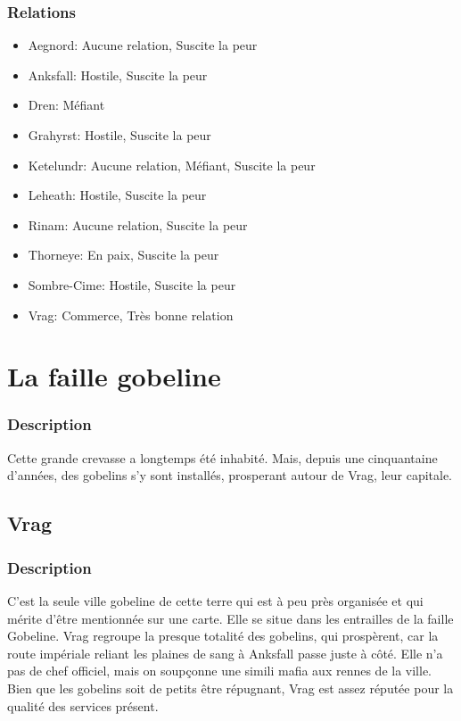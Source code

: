 \subsubsection{Relations}
\begin{itemize}
\item Aegnord: Aucune relation, Suscite la peur  
\item Anksfall: Hostile, Suscite la peur  
\item Dren: Méfiant   
\item Grahyrst: Hostile, Suscite la peur  
\item Ketelundr: Aucune relation, Méfiant, Suscite la peur 
\item Leheath: Hostile, Suscite la peur  
\item Rinam: Aucune relation, Suscite la peur
\item Thorneye: En paix, Suscite la peur
\item Sombre-Cime: Hostile, Suscite la peur  
\item Vrag: Commerce, Très bonne relation 
\end{itemize}
\section{La faille gobeline}
\subsubsection{Description}
\hypertarget {lafaillegobeline}{}Cette grande crevasse a longtemps été inhabité.
Mais, depuis une cinquantaine d'années, des gobelins s'y sont installés, prosperant autour de Vrag, leur capitale.
\subsection{Vrag}
\subsubsection{Description}
\hypertarget{vrag}{}C’est la seule ville gobeline de cette terre qui est à peu près organisée et qui mérite d’être mentionnée sur une carte. Elle se situe dans les entrailles de la faille Gobeline. Vrag regroupe la presque totalité des gobelins, qui prospèrent, car la route impériale reliant les plaines de sang à Anksfall passe juste à côté. Elle n’a pas de chef officiel, mais on soupçonne une simili mafia aux rennes de la ville. Bien que les gobelins soit de petits être répugnant, Vrag est assez réputée pour la qualité des services présent. 
